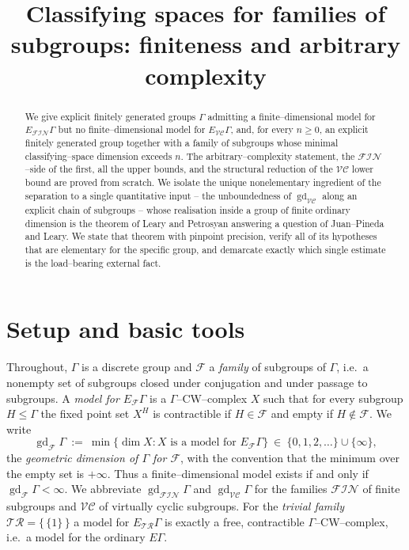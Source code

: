 \documentclass{amsart}
\theoremstyle{definition}
\newcommand{\FIN}{\mathcal{F\!I\!N}}
\newcommand{\VC}{\mathcal{V\!C}}
\newcommand{\gd}{\operatorname{gd}}
\begin{document}
\title{Classifying spaces for families of subgroups: finiteness and arbitrary complexity}
\maketitle

\begin{abstract}
We give explicit finitely generated groups $\Gamma$ admitting a finite--dimensional model
for $E_{\FIN}\Gamma$ but no finite--dimensional model for $E_{\VC}\Gamma$, and, for every
$n\ge 0$, an explicit finitely generated group together with a family of subgroups whose
minimal classifying--space dimension exceeds $n$. The arbitrary--complexity statement, the
$\FIN$--side of the first, all the upper bounds, and the structural reduction of the $\VC$
lower bound are proved from scratch. We isolate the unique nonelementary ingredient of the
separation to a single quantitative input -- the unboundedness of $\gd_{\VC}$ along an
explicit chain of subgroups -- whose realisation inside a group of finite ordinary dimension
is the theorem of Leary and Petrosyan answering a question of Juan--Pineda and Leary. We state
that theorem with pinpoint precision, verify all of its hypotheses that are elementary for the
specific group, and demarcate exactly which single estimate is the load--bearing external
fact.
\end{abstract}

\section{Setup and basic tools}

Throughout, $\Gamma$ is a discrete group and $\mathcal F$ a \emph{family} of subgroups of
$\Gamma$, i.e.\ a nonempty set of subgroups closed under conjugation and under passage to
subgroups. A \emph{model for $E_{\mathcal F}\Gamma$} is a $\Gamma$--CW--complex $X$ such that
for every subgroup $H\le\Gamma$ the fixed point set $X^H$ is contractible if $H\in\mathcal F$
and empty if $H\notin\mathcal F$. We write
\[
\gd_{\mathcal F}\Gamma\ :=\ \min\{\dim X : X \text{ is a model for } E_{\mathcal F}\Gamma\}\ \in\ \{0,1,2,\dots\}\cup\{\infty\},
\]
the \emph{geometric dimension of $\Gamma$ for $\mathcal F$}, with the convention that the
minimum over the empty set is $+\infty$. Thus a finite--dimensional model exists if and only if
$\gd_{\mathcal F}\Gamma<\infty$. We abbreviate $\gd_{\FIN}\Gamma$ and $\gd_{\VC}\Gamma$ for the
families $\FIN$ of finite subgroups and $\VC$ of virtually cyclic subgroups. For the
\emph{trivial family} $\mathcal{TR}=\{\,\{1\}\,\}$ a model for $E_{\mathcal{TR}}\Gamma$ is
exactly a free, contractible $\Gamma$--CW--complex, i.e.\ a model for the ordinary $E\Gamma$.
\end{document}
